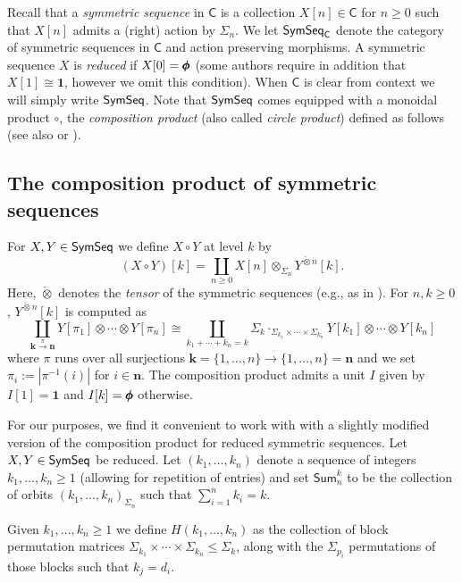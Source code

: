 Recall that a \textit{symmetric sequence} in $\mathsf{C}$ is a collection $X[n]\in\mathsf{C}$ for $n\geq 0$ such that $X[n]$ admits a (right) action by $\Sigma_n$. We let $\mathsf{SymSeq}_{\mathsf{C}}$ denote the category of symmetric sequences in $\mathsf{C}$ and action preserving morphisms. A symmetric sequence $X$ is \textit{reduced} if $X[0]=\pmb{\phi}$ (some authors require in addition that $X[1]\cong \mathbf{1}$, however we omit this condition). When $\mathsf{C}$ is clear from context we will simply write $\mathsf{SymSeq}$.
Note that $\mathsf{SymSeq}$ comes equipped with a monoidal product $\circ$, the \textit{composition product} (also called \textit{circle product}) defined as follows (see also \cite{Rezk-thesis} or \cite{Har-1}). 

\subsection{The composition product of symmetric sequences} For $X,Y\in \mathsf{SymSeq}$ we define $X\circ Y$ at level $k$ by \begin{equation}
    (X {\circ} Y)[k] = \coprod_{n\geq 0} X[n] \otimes_{\Sigma_n} Y^{\check{\otimes} n} [k].
\end{equation}
Here, $\check{\otimes}$ denotes the \textit{tensor} of the symmetric sequences (e.g., as in \cite{Har-1}). For $n,k\geq 0$, $Y^{\check{\otimes} n}[k]$ is computed as \[ \coprod_{\mathbf{k}\xrightarrow{\pi} \mathbf{n}} Y[\pi_1] {\otimes} \cdots {\otimes} Y[\pi_n] \cong \coprod_{k_1+\cdots+k_n=k} \Sigma_k \cdot_{\Sigma_{k_1} \times\cdots\times \Sigma_{k_n}} Y[k_1] {\otimes} \cdots {\otimes} Y[k_n] \]
where $\pi$ runs over all surjections $\mathbf{k}=\{1,\dots,n\}\to \{1,\dots,n\}=\mathbf{n}$ and we set $\pi_i:=|\pi^{-1}(i)|$ for $i\in \mathbf{n}$. The composition product admits a unit $I$ given by $I[1]=\mathbf{1}$ and $I[k]=\pmb{\phi}$ otherwise.

For our purposes, we find it convenient to work with with a slightly modified version of the composition product for reduced symmetric sequences. Let $X,Y\in \mathsf{SymSeq}$ be reduced. Let $(k_1,\dots,k_n)$ denote a sequence of integers $k_1,\dots,k_n\geq 1$ (allowing for repetition of entries) and set $\mathsf{Sum}_n^k$ to be the collection of orbits $(k_1,\dots,k_n)_{\Sigma_n}$ such that $\sum_{i=1}^n k_i=k$. 

\begin{definition}\label{def:H} Given $k_1,\dots,k_n\geq 1$ we define $H(k_1,\dots,k_n)$ as the collection of block permutation matrices $\Sigma_{k_1}\times \cdots \times \Sigma_{k_n}\leq \Sigma_k$, along with the $\Sigma_{p_i}$ permutations of those blocks such that $k_j=d_i$. 
\end{definition}


